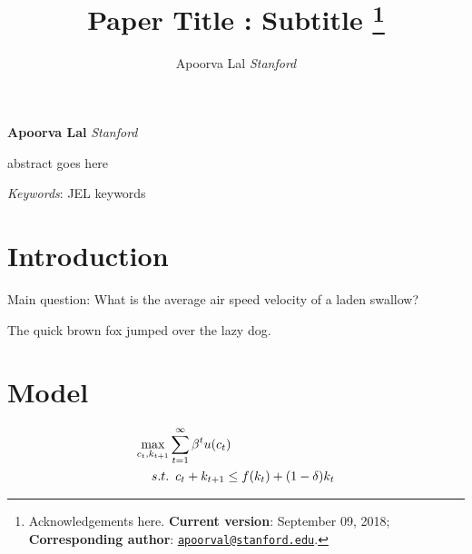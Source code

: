 \documentclass[12pt,]{article}
\title{Paper Title : Subtitle \thanks{Acknowledgements here. \textbf{Current version}: September 09, 2018;
\textbf{Corresponding author}:
\href{mailto:apoorval@stanford.edu}{\nolinkurl{apoorval@stanford.edu}}.}  }
\author{\Large Apoorva Lal\vspace{0.05in} \newline\normalsize\emph{Stanford}  }
\date{}
\renewenvironment{abstract}
 {{%
    \setlength{\leftmargin}{0mm}
    \setlength{\rightmargin}{\leftmargin}%
  }%
  \relax}
 {\endlist}
\newcommand{\maximise}{\operatornamewithlimits{max}}
\begin{document}
%



\maketitle

{%
\thispagestyle{plain}
{ \selectfont
\maketitle  %
}

{
   \vskip 13.5pt\relax \normalsize\fontsize{14}{14}
\textbf{Apoorva Lal} \hskip 15pt \emph{\small Stanford}   
}
}





\begin{abstract}

    \hbox{\vrule height .2pt width 39.14pc}

    \vskip 8.5pt %

\noindent abstract goes here


\vskip 8.5pt \noindent \emph{Keywords}: JEL keywords \par

    \hbox{\vrule height .2pt width 39.14pc}



\end{abstract}


\vskip 6.5pt




\noindent \doublespacing \section{Introduction}\label{introduction}

Main question: What is the average air speed velocity of a laden
swallow?

\textcite{Deatonanalysishouseholdsurveys1997}

The quick brown fox jumped over the lazy dog.

\section{Model}\label{model}

\begin{align*}
\maximise_{c_t,k_{t+1}} &  \sum_{t=1}^{\infty} \beta^t u(c_t)  \\
  s.t. & \enspace c_{t} + k_{t+1} \leq f(k_t) + (1-\delta)k_t
\end{align*}
\end{document}
